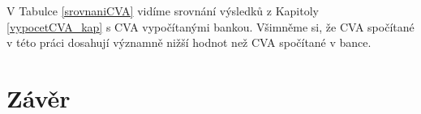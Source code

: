 \documentclass[a4paper,12pt]{report}
\theoremstyle{definition} \newtheorem{definice}[veta]{Definice}
\theoremstyle{remark}
\begin{document}
V Tabulce \ref{srovnaniCVA} vidíme srovnání výsledků z Kapitoly \ref{vypocetCVA_kap} s CVA vypočítanými bankou. 
Všimněme si, že CVA spočítané v této práci dosahují významně nižší hodnot než CVA spočítané v bance.
\begin{table}%
  \centering 
\caption{Srovnání výsledků výpočtů CVA dle metody popsané v této práci a dle metody používané v bance}
\label{srovnaniCVA}
\vspace{5mm}
\end{table}

\chapter*{Závěr} 




\nocite{}  %

\cleardoublepage
{} 

%
%


\end{document}
